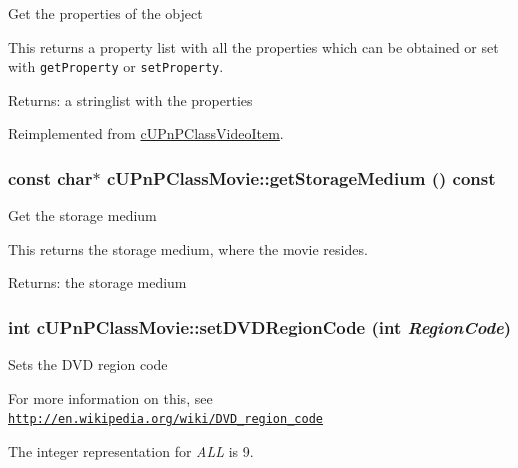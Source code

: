 Get the properties of the object

This returns a property list with all the properties which can be obtained or set with {\tt getProperty} or {\tt setProperty}.

\begin{Desc}
\item[Returns:]a stringlist with the properties \end{Desc}


Reimplemented from \hyperlink{classcUPnPClassVideoItem_9dc397419b45535a3e6a676667b619a4}{cUPnPClassVideoItem}.\hypertarget{classcUPnPClassMovie_9fc36c7e0a1a465ec720b219a1710cc6}{
\subsubsection[{getStorageMedium}]{\setlength{\rightskip}{0pt plus 5cm}const char$\ast$ cUPnPClassMovie::getStorageMedium () const}}
\label{classcUPnPClassMovie_9fc36c7e0a1a465ec720b219a1710cc6}


Get the storage medium

This returns the storage medium, where the movie resides.

\begin{Desc}
\item[Returns:]the storage medium \end{Desc}
\hypertarget{classcUPnPClassMovie_3df7d1a4d798fddde1b379a2302a128c}{
\subsubsection[{setDVDRegionCode}]{\setlength{\rightskip}{0pt plus 5cm}int cUPnPClassMovie::setDVDRegionCode (int {\em RegionCode})}}
\label{classcUPnPClassMovie_3df7d1a4d798fddde1b379a2302a128c}


Sets the DVD region code

For more information on this, see \href{http://en.wikipedia.org/wiki/DVD_region_code}{\tt http://en.wikipedia.org/wiki/DVD\_\-region\_\-code}

The integer representation for {\em ALL\/} is 9.

